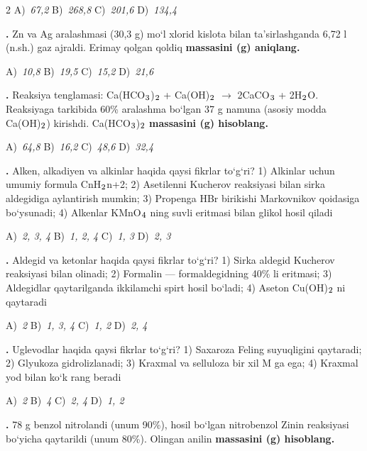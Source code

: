 \documentclass[11pt,a4paper]{article}
\renewcommand{\textsubscript}[1]{\ensuremath{_{\text{\fontsize{8}{8}\selectfont #1}}}}
\newcommand{\qn}[1]{\textbf{\fontsize{11.5}{13}\selectfont #1}}
\newcommand{\qsep}{\par\vspace{13pt}}
\begin{document}
\begin{multicols}{2}
\noindent A)~\textsl{67,2} \hfill B)~\textsl{268,8} \hfill C)~\textsl{201,6} \hfill D)~\textsl{134,4}\par
\qsep
\noindent\qn{18.} Zn va Ag aralashmasi (30,3 g) mo`l xlorid kislota bilan ta'sirlashganda 6,72 l (n.sh.) gaz ajraldi. Erimay qolgan qoldiq \textbf{massasini (g) aniqlang.}

\noindent A)~\textsl{10,8} \hfill B)~\textsl{19,5} \hfill C)~\textsl{15,2} \hfill D)~\textsl{21,6}\par
\qsep
\noindent\qn{19.} Reaksiya tenglamasi: Ca(HCO\textsubscript{3})\textsubscript{2} + Ca(OH)\textsubscript{2} $\to$ 2CaCO\textsubscript{3} + 2H\textsubscript{2}O. Reaksiyaga tarkibida 60\% aralashma bo`lgan 37 g namuna (asosiy modda Ca(OH)\textsubscript{2}) kirishdi. Ca(HCO\textsubscript{3})\textsubscript{2} \textbf{massasini (g) hisoblang.}

\noindent A)~\textsl{64,8} \hfill B)~\textsl{16,2} \hfill C)~\textsl{48,6} \hfill D)~\textsl{32,4}\par
\qsep
\noindent\qn{20.} Alken, alkadiyen va alkinlar haqida qaysi fikrlar to`g`ri? 1) Alkinlar uchun umumiy formula CnH\textsubscript{2}n+2; 2) Asetilenni Kucherov reaksiyasi bilan sirka aldegidiga aylantirish mumkin; 3) Propenga HBr birikishi Markovnikov qoidasiga bo`ysunadi; 4) Alkenlar KMnO\textsubscript{4} ning suvli eritmasi bilan glikol hosil qiladi

\noindent A)~\textsl{2, 3, 4} \hfill B)~\textsl{1, 2, 4} \hfill C)~\textsl{1, 3} \hfill D)~\textsl{2, 3}\par
\qsep
\noindent\qn{21.} Aldegid va ketonlar haqida qaysi fikrlar to`g`ri? 1) Sirka aldegid Kucherov reaksiyasi bilan olinadi; 2) Formalin --- formaldegidning 40\% li eritmasi; 3) Aldegidlar qaytarilganda ikkilamchi spirt hosil bo`ladi; 4) Aseton Cu(OH)\textsubscript{2} ni qaytaradi

\noindent A)~\textsl{2} \hfill B)~\textsl{1, 3, 4} \hfill C)~\textsl{1, 2} \hfill D)~\textsl{2, 4}\par
\qsep
\noindent\qn{22.} Uglevodlar haqida qaysi fikrlar to`g`ri? 1) Saxaroza Feling suyuqligini qaytaradi; 2) Glyukoza gidrolizlanadi; 3) Kraxmal va selluloza bir xil M ga ega; 4) Kraxmal yod bilan ko`k rang beradi

\noindent A)~\textsl{2} \hfill B)~\textsl{4} \hfill C)~\textsl{2, 4} \hfill D)~\textsl{1, 2}\par
\qsep
\noindent\qn{23.} 78 g benzol nitrolandi (unum 90\%), hosil bo`lgan nitrobenzol Zinin reaksiyasi bo`yicha qaytarildi (unum 80\%). Olingan anilin \textbf{massasini (g) hisoblang.}


\end{multicols}
\end{document}
